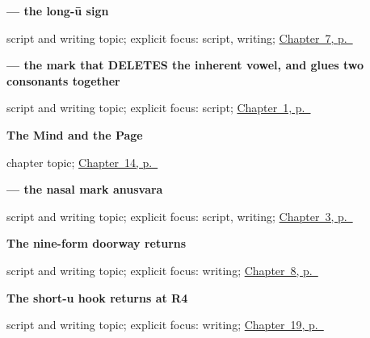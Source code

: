 \noindent\begin{minipage}[t]{\linewidth}
\raggedright
\textbf{ — the long-ū sign}\par
\footnotesize script and writing topic; explicit focus: script, writing; \hyperref[ch:gu-final-script-closure-b]{Chapter~7, p.~\pageref*{ch:gu-final-script-closure-b}}
\end{minipage}\par\smallskip

\noindent\begin{minipage}[t]{\linewidth}
\raggedright
\textbf{ — the mark that DELETES the inherent vowel, and glues two consonants together}\par
\footnotesize script and writing topic; explicit focus: script; \hyperref[ch:first-greeting-script]{Chapter~1, p.~\pageref*{ch:first-greeting-script}}
\end{minipage}\par\smallskip

\noindent\begin{minipage}[t]{\linewidth}
\raggedright
\textbf{The Mind and the Page}\par
\footnotesize chapter topic; \hyperref[ch:gu-mind-and-page]{Chapter~14, p.~\pageref*{ch:gu-mind-and-page}}
\end{minipage}\par\smallskip

\noindent\begin{minipage}[t]{\linewidth}
\raggedright
\textbf{ — the nasal mark anusvara}\par
\footnotesize script and writing topic; explicit focus: script, writing; \hyperref[ch:gu-doorway-forms]{Chapter~3, p.~\pageref*{ch:gu-doorway-forms}}
\end{minipage}\par\smallskip

\noindent\begin{minipage}[t]{\linewidth}
\raggedright
\textbf{The nine-form doorway returns}\par
\footnotesize script and writing topic; explicit focus: writing; \hyperref[ch:introductions]{Chapter~8, p.~\pageref*{ch:introductions}}
\end{minipage}\par\smallskip

\noindent\begin{minipage}[t]{\linewidth}
\raggedright
\textbf{The short-u hook returns at R4}\par
\footnotesize script and writing topic; explicit focus: writing; \hyperref[ch:gu-r4-script-names]{Chapter~19, p.~\pageref*{ch:gu-r4-script-names}}
\end{minipage}\par\smallskip

